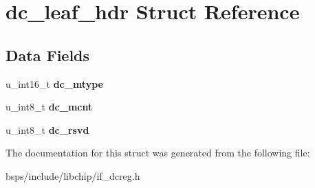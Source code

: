 \hypertarget{structdc__leaf__hdr}{}\section{dc\+\_\+leaf\+\_\+hdr Struct Reference}
\label{structdc__leaf__hdr}
\subsection*{Data Fields}
\begin{DoxyCompactItemize}
\item 
\mbox{\label{structdc__leaf__hdr_a331e2b4bd7031719d0b1bcccdbed59be}} 
u\+\_\+int16\+\_\+t {\bfseries dc\+\_\+mtype}
\item 
\mbox{\label{structdc__leaf__hdr_a8d18dc10705bcf54936ff95e2ee98e74}} 
u\+\_\+int8\+\_\+t {\bfseries dc\+\_\+mcnt}
\item 
\mbox{\label{structdc__leaf__hdr_a082143c1b11d0211b872660b421aeb67}} 
u\+\_\+int8\+\_\+t {\bfseries dc\+\_\+rsvd}
\end{DoxyCompactItemize}


The documentation for this struct was generated from the following file\+:\begin{DoxyCompactItemize}
\item 
bsps/include/libchip/if\+\_\+dcreg.\+h\end{DoxyCompactItemize}
